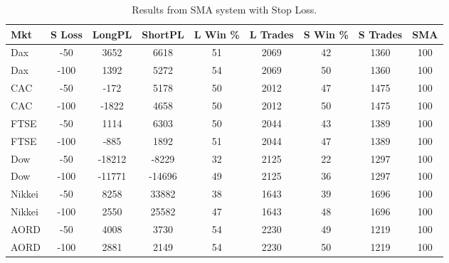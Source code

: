 \begin{table}[ht]
\centering
\caption[SMA Base System with Stop Loss]{Results from SMA system with Stop Loss.} 
\label{tab:sma_results_Sloss}
\begin{tabular}{lcccccccc}
  \toprule Mkt & S Loss & LongPL & ShortPL & L Win \% & L Trades & S Win \% & S Trades & SMA \\ 
  \midrule Dax & -50 & 3652 & 6618 & 51 & 2069 & 42 & 1360 & 100 \\ 
  Dax & -100 & 1392 & 5272 & 54 & 2069 & 50 & 1360 & 100 \\ 
  CAC & -50 & -172 & 5178 & 50 & 2012 & 47 & 1475 & 100 \\ 
  CAC & -100 & -1822 & 4658 & 50 & 2012 & 50 & 1475 & 100 \\ 
  FTSE & -50 & 1114 & 6303 & 50 & 2044 & 43 & 1389 & 100 \\ 
  FTSE & -100 & -885 & 1892 & 51 & 2044 & 47 & 1389 & 100 \\ 
  Dow & -50 & -18212 & -8229 & 32 & 2125 & 22 & 1297 & 100 \\ 
  Dow & -100 & -11771 & -14696 & 49 & 2125 & 36 & 1297 & 100 \\ 
  Nikkei & -50 & 8258 & 33882 & 38 & 1643 & 39 & 1696 & 100 \\ 
  Nikkei & -100 & 2550 & 25582 & 47 & 1643 & 48 & 1696 & 100 \\ 
  AORD & -50 & 4008 & 3730 & 54 & 2230 & 49 & 1219 & 100 \\ 
  AORD & -100 & 2881 & 2149 & 54 & 2230 & 50 & 1219 & 100 \\ 
   \bottomrule \end{tabular}
\end{table}
